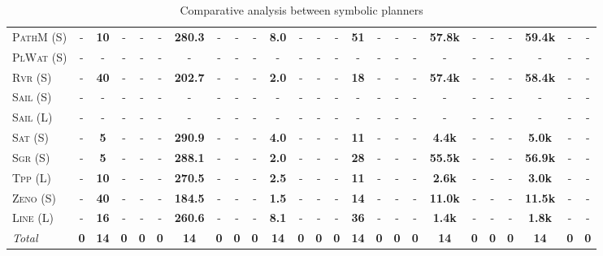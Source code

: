 \documentclass[11pt,landscape]{article}
\begin{document}
\begin{table*}[tb]
{\begin{tabular}{|l||cccc||cccc||cccc||cccc||cccc||cccc||}
\textsc{PathM} (S)&-&\textbf{10}&-&-&-&\textbf{280.3}&-&-&-&\textbf{8.0}&-&-&-&\textbf{51}&-&-&-&\textbf{57.8k}&-&-&-&\textbf{59.4k}&-&-\\
\textsc{PlWat} (S)&-&-&-&-&-&-&-&-&-&-&-&-&-&-&-&-&-&-&-&-&-&-&-&-\\
\textsc{Rvr} (S)&-&\textbf{40}&-&-&-&\textbf{202.7}&-&-&-&\textbf{2.0}&-&-&-&\textbf{18}&-&-&-&\textbf{57.4k}&-&-&-&\textbf{58.4k}&-&-\\
\textsc{Sail} (S)&-&-&-&-&-&-&-&-&-&-&-&-&-&-&-&-&-&-&-&-&-&-&-&-\\
\textsc{Sail} (L)&-&-&-&-&-&-&-&-&-&-&-&-&-&-&-&-&-&-&-&-&-&-&-&-\\
\textsc{Sat} (S)&-&\textbf{5}&-&-&-&\textbf{290.9}&-&-&-&\textbf{4.0}&-&-&-&\textbf{11}&-&-&-&\textbf{4.4k}&-&-&-&\textbf{5.0k}&-&-\\
\textsc{Sgr} (S)&-&\textbf{5}&-&-&-&\textbf{288.1}&-&-&-&\textbf{2.0}&-&-&-&\textbf{28}&-&-&-&\textbf{55.5k}&-&-&-&\textbf{56.9k}&-&-\\
\textsc{Tpp} (L)&-&\textbf{10}&-&-&-&\textbf{270.5}&-&-&-&\textbf{2.5}&-&-&-&\textbf{11}&-&-&-&\textbf{2.6k}&-&-&-&\textbf{3.0k}&-&-\\
\textsc{Zeno} (S)&-&\textbf{40}&-&-&-&\textbf{184.5}&-&-&-&\textbf{1.5}&-&-&-&\textbf{14}&-&-&-&\textbf{11.0k}&-&-&-&\textbf{11.5k}&-&-\\
\textsc{Line} (L)&-&\textbf{16}&-&-&-&\textbf{260.6}&-&-&-&\textbf{8.1}&-&-&-&\textbf{36}&-&-&-&\textbf{1.4k}&-&-&-&\textbf{1.8k}&-&-
\\\hline
\textit{Total}&\textbf{0}&\textbf{14}&\textbf{0}&\textbf{0}&\textbf{0}&\textbf{14}&\textbf{0}&\textbf{0}&\textbf{0}&\textbf{14}&\textbf{0}&\textbf{0}&\textbf{0}&\textbf{14}&\textbf{0}&\textbf{0}&\textbf{0}&\textbf{14}&\textbf{0}&\textbf{0}&\textbf{0}&\textbf{14}&\textbf{0}&\textbf{0}\\\hline

        \end{tabular}}
        \caption{Comparative analysis between symbolic planners}
        \label{tab:symbolic}
        \end{table*}
        
\end{document}
